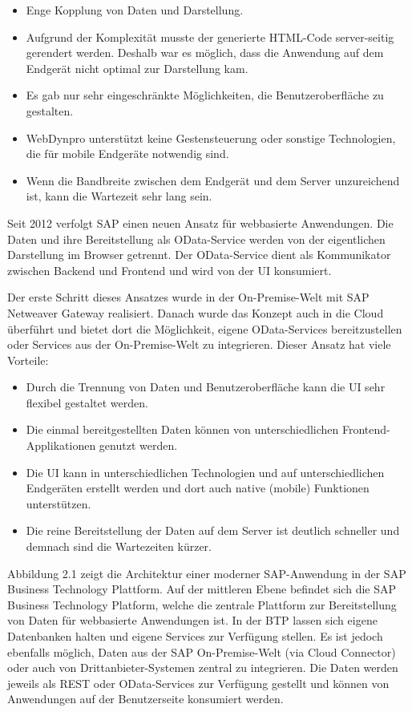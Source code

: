 \begin{itemize}[noitemsep]
\item Enge Kopplung von Daten und Darstellung.
\item Aufgrund der Komplexität musste der generierte HTML-Code server-seitig gerendert werden. Deshalb war es möglich, dass die Anwendung auf dem Endgerät nicht optimal zur Darstellung kam.
\item Es gab nur sehr eingeschränkte Möglichkeiten, die Benutzeroberfläche zu gestalten.
\item WebDynpro unterstützt keine Gestensteuerung oder sonstige Technologien, die für mobile Endgeräte notwendig sind.
\item Wenn die Bandbreite zwischen dem Endgerät und dem Server unzureichend ist, kann die Wartezeit sehr lang sein.
\end{itemize}

Seit 2012 verfolgt SAP einen neuen Ansatz für webbasierte Anwendungen. Die Daten und ihre Bereitstellung als OData-Service werden von der eigentlichen Darstellung im Browser getrennt. Der OData-Service dient als Kommunikator zwischen Backend und Frontend und wird von der UI konsumiert. 

Der erste Schritt dieses Ansatzes wurde in der On-Premise-Welt mit SAP Netweaver Gateway realisiert. Danach wurde das Konzept auch in die Cloud überführt und bietet dort die Möglichkeit, eigene OData-Services bereitzustellen oder Services aus der On-Premise-Welt zu integrieren. Dieser Ansatz hat viele Vorteile:

\begin{itemize}[noitemsep]
\item Durch die Trennung von Daten und Benutzeroberfläche kann die UI sehr flexibel gestaltet werden. 
\item Die einmal bereitgestellten Daten können von unterschiedlichen Frontend-Applikationen genutzt werden.
\item Die UI kann in unterschiedlichen Technologien und auf unterschiedlichen Endgeräten erstellt werden und dort auch native (mobile) Funktionen unterstützen.
\item Die reine Bereitstellung der Daten auf dem Server ist deutlich schneller und demnach sind die Wartezeiten kürzer. 
\end{itemize}

Abbildung 2.1 zeigt die Architektur einer moderner SAP-Anwendung in der SAP Business Technology Plattform. Auf der mittleren Ebene befindet sich die SAP Business Technology Platform, welche die zentrale Plattform zur Bereitstellung von Daten für webbasierte Anwendungen ist. In der BTP lassen sich eigene Datenbanken halten und eigene Services zur Verfügung stellen. Es ist jedoch ebenfalls möglich, Daten aus der SAP On-Premise-Welt (via Cloud Connector) oder auch von Drittanbieter-Systemen zentral zu integrieren. Die Daten werden jeweils als REST oder OData-Services zur Verfügung gestellt und können von Anwendungen auf der Benutzerseite konsumiert werden. 

